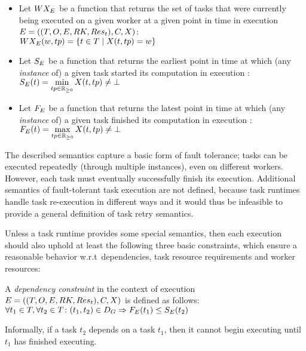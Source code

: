 \begin{itemize}[itemsep=0pt]
	\item Let $WX_E$ be a function that returns the set of tasks that were currently being
	executed on a given worker at a given point in time in execution
	$E = ((T, O, E, RK, Res_t), C, X)$: \\
	$WX_E(w, tp) = \{t \in{} T \mid X(t, tp) = w \}$
	\item Let $S_E$ be a function that returns the earliest point in time at which (any
	\emph{instance} of) a given task started its computation in execution \taskgraphexecution: \\
	$S_E(t) = \min\limits_{tp \in\mathbb{R}_{\geq{}0}} X(t, tp) \neq \bot$
	\item Let $F_E$ be a function that returns the latest point in time at which (any
	\emph{instance} of) a given task finished its computation in execution \taskgraphexecution: \\
	$F_E(t) = \max\limits_{tp \in\mathbb{R}_{\geq{}0}} X(t, tp) \neq \bot$
\end{itemize}

The described semantics capture a basic form of fault tolerance; tasks can be executed repeatedly
(through multiple instances), even on different workers. However, each task must eventually
successfully finish its execution. Additional semantics of fault-tolerant task execution are not
defined, because task runtimes handle task re-execution in different ways and it would thus be
infeasible to provide a general definition of task retry semantics.

Unless a task runtime provides some special semantics, then each execution
should also uphold at least the following three basic constraints, which ensure a reasonable
behavior w.r.t\ dependencies, task resource requirements and worker resources:

\vspace{2mm} A
\emph{dependency constraint} in the context of execution \\
$E = ((T, O, E, RK, Res_t), C, X)$ is defined as follows: \vspace{1mm}\\
$\forall t_1\in{}T, \forall t_2\in{}T\colon (t_1, t_2) \in D_G \Rightarrow F_E(t_1) \leq S_E(t_2)$

\vspace{1mm}Informally, if a task $t_2$ depends on a task $t_1$, then it cannot begin executing
until $t_1$ has finished executing.

